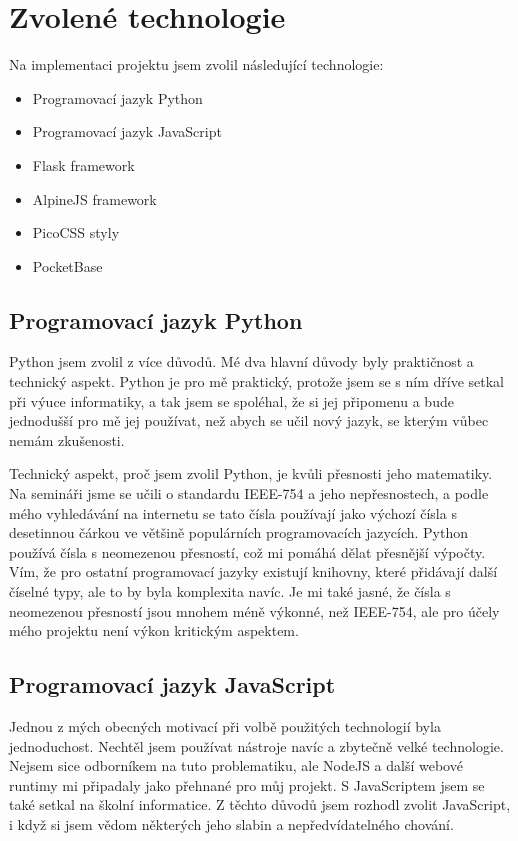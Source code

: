 \documentclass[11pt,a4paper,twoside,openright]{report}
\begin{document}
\section{Zvolené technologie}
Na implementaci projektu jsem zvolil následující technologie:

\begin{itemize}
  \item Programovací jazyk Python
  \item Programovací jazyk JavaScript
  \item Flask framework
  \item AlpineJS framework
  \item PicoCSS styly
  \item PocketBase
\end{itemize}

\subsection{Programovací jazyk Python}
Python jsem zvolil z více důvodů. Mé dva hlavní důvody byly praktičnost a technický aspekt. Python je
pro mě praktický, protože jsem se s ním dříve setkal při výuce informatiky, a tak jsem se spoléhal, že
si jej připomenu a bude jednodušší pro mě jej používat, než abych se učil nový jazyk, se kterým vůbec nemám
zkušenosti.

Technický aspekt, proč jsem zvolil Python, je kvůli přesnosti jeho matematiky. Na semináři jsme se učili o
standardu IEEE-754 a jeho nepřesnostech, a podle mého vyhledávání na internetu se tato čísla používají jako
výchozí čísla s desetinnou čárkou ve většině populárních programovacích jazycích. Python používá čísla s
neomezenou přesností, což mi pomáhá dělat přesnější výpočty. Vím, že pro ostatní programovací jazyky existují
knihovny, které přidávají další číselné typy, ale to by byla komplexita navíc. Je mi také jasné, že čísla
s neomezenou přesností jsou mnohem méně výkonné, než IEEE-754, ale pro účely mého projektu není výkon kritickým
aspektem.

\subsection{Programovací jazyk JavaScript}
Jednou z mých obecných motivací při volbě použitých technologií byla jednoduchost. Nechtěl jsem používat
nástroje navíc a zbytečně velké technologie. Nejsem sice odborníkem na tuto problematiku, ale NodeJS a další
webové runtimy mi připadaly jako přehnané pro můj projekt. S JavaScriptem jsem se také setkal na školní informatice.
Z těchto důvodů jsem rozhodl zvolit JavaScript, i když si jsem vědom některých jeho slabin a nepředvídatelného
chování.
\end{document}

